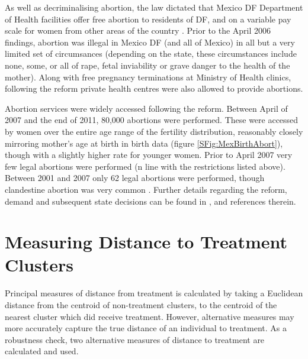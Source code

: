 As well as decriminalising abortion, the law dictated that Mexico DF Department
of Health facilities offer free abortion to residents of DF, and on a variable
pay scale for women from other areas of the country \citep{Beckeretal2013}. 
Prior to the April 2006 findings, abortion was illegal in Mexico DF (and all of
Mexico) in all but a very limited set of circumsances (depending on the state,
these circumstances include none, some, or all of rape, fetal inviability or 
grave danger to the health of the mother).  Along with free pregnancy 
terminations at Ministry of Health clinics, following the reform private 
health centres were also allowed to provide abortions.  

Abortion services were widely accessed following the reform.  Between April 
of 2007 and the end of 2011, 80,000 abortions were performed.  These were 
accessed by women over the entire age range of the fertility distribution,
reasonably closely mirroring mother's age at birth in birth data (figure
\ref{SFig:MexBirthAbort}), though with a slightly higher rate for younger
women.  Prior to April 2007 very few legal abortions were performed (n line
with the restrictions listed above).  Between 2001 and 2007 only 62 legal
abortions were performed, though clandestine abortion was very common 
\citep{Beckeretal2013}.  Further details regarding the reform, demand and
subsequent state decisions can be found in \citep{Beckeretal2013}, and 
references therein.

\section{Measuring Distance to Treatment Clusters}
\label{Sscn:distApp}
Principal measures of distance from treatment is calculated by taking a 
Euclidean distance from the centroid of non-treatment clusters, to the centroid 
of the nearest cluster which did receive treatment. However, alternative 
measures may more accurately capture the true distance of an individual to 
treatment.  As a robustness check, two alternative measures of distance to 
treatment are calculated and used.


